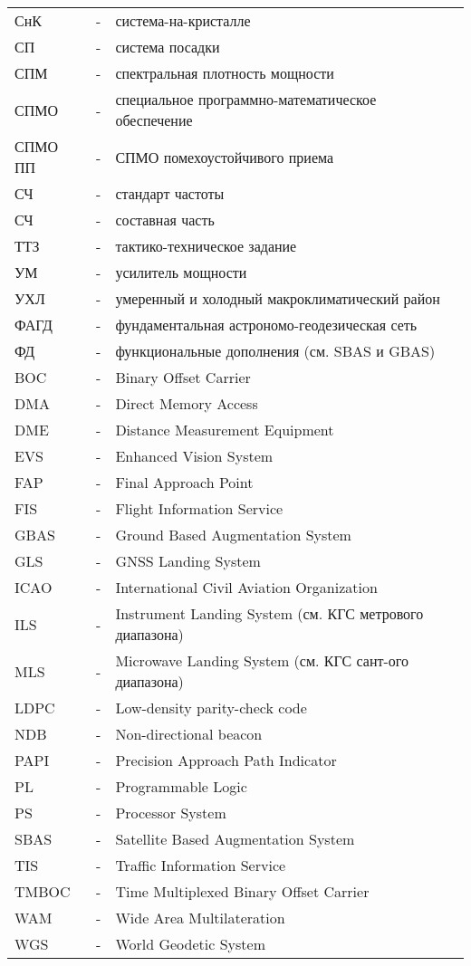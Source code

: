 \begin{longtable}{lll}
СнК  & - & система-на-кристалле \\
СП   & - & система посадки \\
СПМ  & - & спектральная плотность мощности \\
СПМО & - & специальное программно-математическое обеспечение \\
СПМО ПП & - & СПМО помехоустойчивого приема \\
СЧ   & - & стандарт частоты \\
СЧ   & - & составная часть \\
ТТЗ  & - & тактико-техническое задание \\
УМ   & - & усилитель мощности \\
УХЛ  & - & умеренный и холодный макроклиматический район \\
ФАГД & - & фундаментальная астрономо-геодезическая сеть \\
ФД   & - & функциональные дополнения (см. SBAS и GBAS) \\
BOC  & - & Binary Offset Carrier   \\
DMA  & - & Direct Memory Access   \\
DME  & - & Distance Measurement Equipment \\
EVS  & - & Enhanced Vision System \\
FAP  & - & Final Approach Point \\
FIS  & - & Flight Information Service \\
GBAS & - & Ground Based Augmentation System   \\
GLS  & - & GNSS Landing System   \\
ICAO & - & International Civil Aviation Organization \\ 
ILS  & - & Instrument Landing System (см. КГС метрового диапазона) \\
MLS  & - & Microwave Landing System (см. КГС сант-ого диапазона) \\
LDPC & - & Low-density parity-check code \\
NDB  & - & Non-directional beacon \\
PAPI & - & Precision Approach Path Indicator   \\
PL   & - & Programmable Logic   \\
PS   & - & Processor System   \\
SBAS & - & Satellite Based Augmentation System   \\
TIS  & - & Traffic Information Service  \\
TMBOC& - & Time Multiplexed Binary Offset Carrier   \\
WAM  & - & Wide Area Multilateration  \\
WGS  & - & World Geodetic System  \\
\end{longtable} 